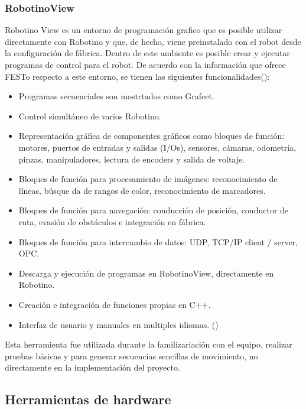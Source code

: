             \subsubsection{RobotinoView}
            Robotino View es un entorno de programación grafico que es posible utilizar directamente con Robotino y que, de hecho, viene preinstalado con el robot desde la configuración de fábrica. Dentro de este ambiente es posible crear y ejecutar programas de control para el robot.
            De acuerdo con la información que ofrece FESTo respecto a este entorno, se tienen las siguientes funcionalidades(\cite{FESTO-RobotinoView}):
            \begin{itemize}
                \item Programas secuenciales son mostrtados como Grafcet.
                \item Control simultáneo de varios Robotino.
                \item Representación gráfica de componentes gráficos como bloques de función: motores, puertos de entradas y salidas (I/Os), sensores, cámaras, odometría, pinzas, manipuladores, lectura de encoders y salida de voltaje.
                \item Bloques de función para procesamiento de imágenes: reconocimiento de líneas, búsque da de rangos de color, reconocimiento de marcadores.
                \item Bloques de función para navegación: conducción de posición, conductor de ruta, evasión de obstáculos e integración en fábrica.
                \item Bloques de función para intercambio de datos: UDP, TCP/IP client / server, OPC.
                \item Descarga y ejecución de programas en RobotinoView, directamente en Robotino.
                \item Creación e integración de funciones propias en C++.
                \item Interfaz de usuario y manuales en multiples idiomas. (\cite*{FESTO-RobotinoView})
            \end{itemize}

            Esta herramienta fue utilizada durante la familizariación con el equipo, realizar pruebas básicas y para generar secuencias sencillas de movimiento, no directamente en la implementación del proyecto.
            
        \subsection{Herramientas de hardware}
